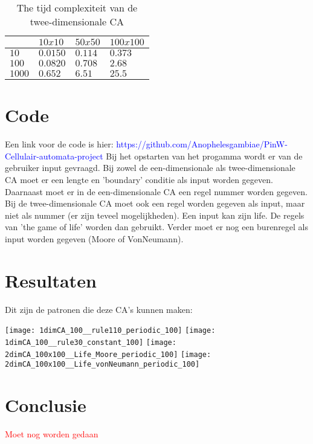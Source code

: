 \documentclass[12pt,a4paper]{article}
\begin{document}
\begin{table*}
    \centering
    \begin{tabular}{|m{1.2cm}|m{2.0cm}|m{2.0cm}|m{2.0cm}|}
        \hline
        $\phantom{.}$ & $10x10$ & $50x50$ & $100x100$ \\
        \hline
        $10$ & $0.0150$ & $0.114$ & $0.373$ \\
        \hline
        $100$ & $0.0820$ & $0.708$ & $2.68$ \\
        \hline
        $1000$ & $0.652$ & $6.51$ & $25.5$ \\
        \hline
    \end{tabular}
    \caption{The tijd complexiteit van de twee-dimensionale CA}
    \label{tbl:2dim}
\end{table*}

\section*{Code}
Een link voor de code is hier: 
\textcolor{blue}{https://github.com/Anophelesgambiae/PinW-Cellulair-automata-project}
\newline
Bij het opstarten van het progamma wordt er van de gebruiker input gevraagd.
\newline
Bij zowel de een-dimensionale als twee-dimensionale CA moet 
er een lengte en 'boundary' conditie als input worden gegeven.
Daarnaast moet er in de een-dimensionale CA een regel nummer worden gegeven.
Bij de twee-dimensionale CA moet ook een regel worden gegeven als input, maar niet als nummer (er zijn teveel mogelijkheden).
Een input kan zijn life. De regels van 'the game of life' worden dan gebruikt.
Verder moet er nog een burenregel als input worden gegeven (Moore of VonNeumann).

\section*{Resultaten}
Dit zijn de patronen die deze CA's kunnen maken:
\newline
\graphicspath{ {./CA_project_2024/} }
\texttt{[image: 1dimCA\_100\_\_rule110\_periodic\_100]}
\texttt{[image: 1dimCA\_100\_\_rule30\_constant\_100]}
\texttt{[image: 2dimCA\_100x100\_\_Life\_Moore\_periodic\_100]}
\texttt{[image: 2dimCA\_100x100\_\_Life\_vonNeumann\_periodic\_100]}

\section*{Conclusie}
\textcolor{red}{Moet nog worden gedaan}
\end{document}
